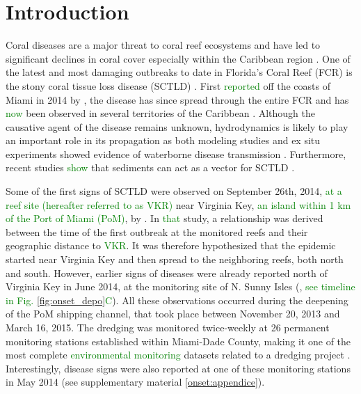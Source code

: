 \documentclass[preprint,12pt,authoryear]{elsarticle}
\newcommand{\modif}[1]{\textcolor{green}{#1}}
\begin{document}
\linenumbers

\section{Introduction}

Coral diseases are a major threat to coral reef ecosystems and have led to significant declines in coral cover especially within the Caribbean region \citep{richardson1998coral, sutherland2004disease, aronson2001white, harvell2007coral, brandt2009dynamics}. One of the latest and most damaging outbreaks to date in Florida's Coral Reef (FCR) is the stony coral tissue loss disease (SCTLD) \citep{noaa2018}. First \modif{reported} off the coasts of Miami in 2014 by \cite{precht2016unprecedented}, the disease has since spread through the entire FCR \citep{muller2020spatial,dobbelaere2022connecting} and has \modif{now} been observed in several territories of the Caribbean \citep{kramer2019map, meiling2021variable, estrada2021effects,heres2021ecological}. Although the causative agent of the disease remains unknown, hydrodynamics is likely to play an important role in its propagation as both modeling studies and ex situ experiments showed evidence of waterborne disease transmission \citep{aeby2019pathogenesis,dobbelaere2020coupled,eaton2021measuring, meiling2021variable}. Furthermore, recent studies \modif{show} that sediments can act as  a vector for SCTLD \citep{rosales2020rhodobacterales, studivan2022reef}.

Some of the first signs of SCTLD were observed on September 26th, 2014, \modif{at a reef site (hereafter referred to as VKR)} near Virginia Key, \modif{an island within 1 km of the Port of Miami (PoM)}, by \cite{precht2016unprecedented}. In \modif{that} study, a relationship was derived between the time of the first outbreak at the monitored reefs and their geographic distance to \modif{VKR}. It was therefore hypothesized that the epidemic started near Virginia Key and then spread to the neighboring reefs, both north and south. However, earlier signs of diseases were already reported north of Virginia Key in June 2014, at the monitoring site of N. Sunny Isles (\citealp{precht2016unprecedented}, \modif{see timeline in Fig. \ref{fig:onset_depo}C}). All these observations occurred during the deepening of the PoM shipping channel, that took place between November 20, 2013 and March 16, 2015. The dredging was monitored twice-weekly at 26 permanent monitoring stations established within Miami-Dade County, making it one of the most complete \modif{environmental monitoring} datasets related to a dredging project \citep{gintert2019regional}. Interestingly, disease signs were also reported at one of these monitoring stations in May 2014 (see supplementary material \ref{onset:appendice}).
\end{document}

